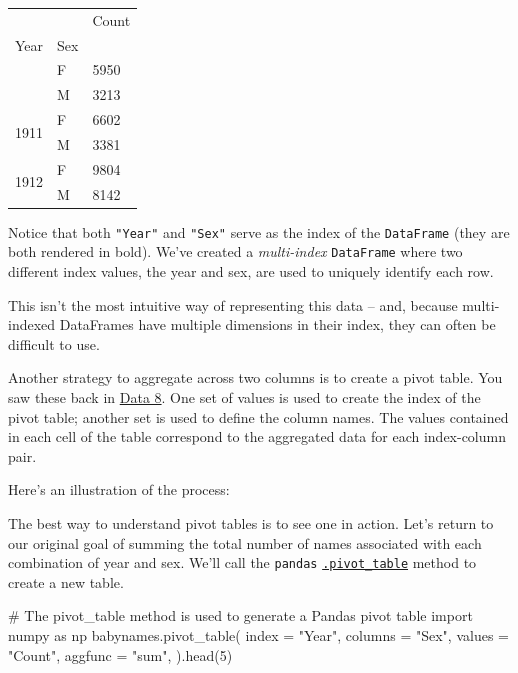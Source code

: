 \documentclass[
  letterpaper,
  DIV=11,
  numbers=noendperiod]{scrreprt}
\newenvironment{Shaded}{\begin{snugshade}}{\end{snugshade}}
\newcommand{\CommentTok}[1]{\textcolor[rgb]{0.37,0.37,0.37}{#1}}
\newcommand{\DecValTok}[1]{\textcolor[rgb]{0.68,0.00,0.00}{#1}}
\newcommand{\ImportTok}[1]{\textcolor[rgb]{0.00,0.46,0.62}{#1}}
\newcommand{\NormalTok}[1]{\textcolor[rgb]{0.00,0.23,0.31}{#1}}
\newcommand{\OperatorTok}[1]{\textcolor[rgb]{0.37,0.37,0.37}{#1}}
\newcommand{\StringTok}[1]{\textcolor[rgb]{0.13,0.47,0.30}{#1}}
\begin{document}
\begin{longtable}[]{@{}lll@{}}
\toprule\noalign{}
& & Count \\
Year & Sex & \\
\midrule\noalign{}
\endhead
\bottomrule\noalign{}
\endlastfoot
\multirow{2}{=}{1910} & F & 5950 \\
& M & 3213 \\
\multirow{2}{=}{1911} & F & 6602 \\
& M & 3381 \\
\multirow{2}{=}{1912} & F & 9804 \\
& M & 8142 \\
\end{longtable}

Notice that both \texttt{"Year"} and \texttt{"Sex"} serve as the index
of the \texttt{DataFrame} (they are both rendered in bold). We've
created a \emph{multi-index} \texttt{DataFrame} where two different
index values, the year and sex, are used to uniquely identify each row.

This isn't the most intuitive way of representing this data -- and,
because multi-indexed DataFrames have multiple dimensions in their
index, they can often be difficult to use.

Another strategy to aggregate across two columns is to create a pivot
table. You saw these back in
\href{https://inferentialthinking.com/chapters/08/3/Cross-Classifying_by_More_than_One_Variable.html\#pivot-tables-rearranging-the-output-of-group}{Data
8}. One set of values is used to create the index of the pivot table;
another set is used to define the column names. The values contained in
each cell of the table correspond to the aggregated data for each
index-column pair.

Here's an illustration of the process:

The best way to understand pivot tables is to see one in action. Let's
return to our original goal of summing the total number of names
associated with each combination of year and sex. We'll call the
\texttt{pandas}
\href{https://pandas.pydata.org/pandas-docs/stable/reference/api/pandas.pivot_table.html}{\texttt{.pivot\_table}}
method to create a new table.

\begin{Shaded}
\begin{Highlighting}[]
\CommentTok{\# The \textasciigrave{}pivot\_table\textasciigrave{} method is used to generate a Pandas pivot table}
\ImportTok{import}\NormalTok{ numpy }\ImportTok{as}\NormalTok{ np}
\NormalTok{babynames.pivot\_table(}
\NormalTok{    index }\OperatorTok{=} \StringTok{"Year"}\NormalTok{,}
\NormalTok{    columns }\OperatorTok{=} \StringTok{"Sex"}\NormalTok{,    }
\NormalTok{    values }\OperatorTok{=} \StringTok{"Count"}\NormalTok{, }
\NormalTok{    aggfunc }\OperatorTok{=} \StringTok{"sum"}\NormalTok{, }
\NormalTok{).head(}\DecValTok{5}\NormalTok{)}
\end{Highlighting}
\end{Shaded}
\end{document}
